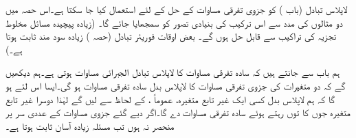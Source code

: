 لاپلاس تبادل (باب ) کو جزوی تفرقی مساوات کے حل کے لئے استعمال کیا جا سکتا ہے۔اس حصہ میں دو مثالوں کی مدد سے اس ترکیب کی بنیادی تصور کو سمجھایا جائے گا۔ (زیادہ پیچیدہ مسائل مخلوط تجزیہ کی تراکیب سے قابل حل ہوں گے۔ بعض اوقات فوریئر تبادل (حصہ ) زیادہ سود مند ثابت ہوتا ہے۔)

ہم باب  سے جانتے ہیں کہ سادہ تفرقی مساوات کا لاپلاس تبادل الجبرائی مساوات ہوتی ہے۔ہم دیکھیں گے کہ دو متغیرات کی جزوی تفرقی مساوات کا لاپلاس بدل سادہ تفرقی مساوات ہو گی۔ایسا اس لئے ہو گا کہ ہم لاپلاس بدل کسی ایک غیر تابع متغیرہ، عموماً ، کے لحاظ سے لیں گے لہٰذا دوسرا غیر تابع متغیرہ جوں کا توں رہتے ہوئے سادہ تفرقی مساوات دے گا۔اگر دیے گئے جزوی مساوات کے عددی سر  پر منحصر نہ ہوں تب مسئلہ زیادہ آسان ثابت ہوتا ہے۔

